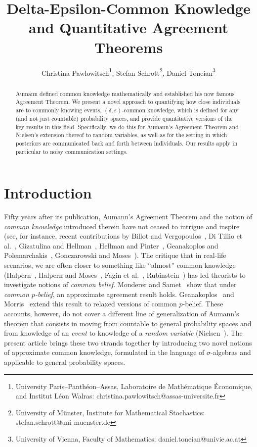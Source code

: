 \documentclass[a4paper, 10pt]{article}
\title{Delta-Epsilon-Common Knowledge and Quantitative Agreement Theorems}
\author{Christina Pawlowitsch\footnote{University Paris--Panthéon--Assas, Laboratoire de Mathématique Économique, and Institut Léon Walras: christina.pawlowitsch@assas-universite.fr}, Stefan Schrott\footnote{University of Münster, Institute for Mathematical Stochastics: stefan.schrott@uni-muenster.de}, Daniel Toneian\footnote{University of Vienna, Faculty of Mathematics: daniel.toneian@univie.ac.at}}
\numberwithin{theorem}{section}
\theoremstyle{definition}
\renewcommand{\epsilon}{\varepsilon}
\begin{document}
	\maketitle
	\begin{abstract}
		
	Aumann \cite{Au76} defined common knowledge mathematically and established his now famous Agreement Theorem. We present a novel approach to quantifying how close individuals are to commonly knowing events, $(\delta,\epsilon)$-common knowledge, which is defined for any (and not just countable) probability spaces, and provide quantitative versions of the key results in this field. Specifically, we do this for Aumann's \cite{Au76}  Agreement Theorem and Nielsen's \cite{Ni84} extension thereof to random variables, as well as for the setting in which posteriors are communicated back and forth between individuals. Our results apply in particular to noisy communication settings.
		\end{abstract}
	
	\section{Introduction}
	
Fifty years after its publication, Aumann's \cite{Au76} Agreement Theorem and the notion of \emph{common knowledge}  introduced therein have not ceased to intrigue and inspire (see, for instance, recent contributions by Billot and Vergopoulos~\cite{BiVe26}, Di Tillio et al.~\cite{DiLeSa22}, Gizatulina and Hellman~\cite{GiHe19}, Hellman and Pinter~\cite{HePi22}, Geanakoplos and Polemarchakis~\cite{GePo23}, Gonczarowski and Moses~\cite{GoMo24}). The critique that in real-life scenarios, we are often closer to something like ``almost'' common knowledge (Halpern~\cite{Ha86}, Halpern and Moses~\cite{HaMo90}, Fagin et al.~\cite{FaHaMoVa04}, Rubinstein~\cite{Ru89}) has led theorists to investigate notions of \emph{common belief}. Monderer and Samet~\cite{MoSa89} show that under \emph{common $p$-belief}, an approximate agreement result holds. Geanakoplos~\cite{Ge94} and Morris~\cite{Mo99} extend this result to relaxed versions of common $p$-belief. These accounts, however, do not cover a different line of generalization of Aumann's theorem that consists in moving from countable to general probability spaces and from knowledge of an \emph{event} to knowledge of a \emph{random variable} (Nielsen~\cite{Ni84}). The present article brings these two strands together by introducing two novel notions of approximate common knowledge, formulated in the language of $\sigma$-algebras and applicable to general probability spaces.  
		 
\end{document}
